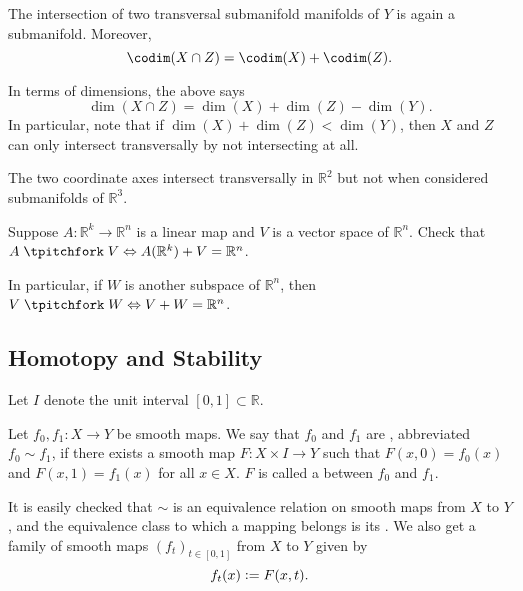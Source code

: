 \begin{thm}
	The intersection of two transversal submanifold manifolds of $Y$ is again a submanifold. Moreover,
	\begin{equation*} 
		\codim(X \cap Z) = \codim(X) + \codim(Z).
	\end{equation*}
\end{thm}
In terms of dimensions, the above says
\begin{equation*} 
	\dim(X \cap Z) = \dim(X) + \dim(Z) - \dim(Y).
\end{equation*}
In particular, note that if $\dim(X) + \dim(Z) < \dim(Y)$, then $X$ and $Z$ can only intersect transversally by not intersecting at all. 

\begin{ex}
	The two coordinate axes intersect transversally in $\mathbb{R}^{2}$ but not when considered submanifolds of $\mathbb{R}^{3}$.
\end{ex}

\begin{exe}
	Suppose $A : \mathbb{R}^{k} \to \mathbb{R}^{n}$ is a linear map and $V$ is a vector space of $\mathbb{R}^{n}$. Check that $A \trans V \Leftrightarrow A(\mathbb{R}^{k}) + V = \mathbb{R}^{n}$. 

	In particular, if $W$ is another subspace of $\mathbb{R}^{n}$, then $V \trans W \Leftrightarrow V + W = \mathbb{R}^{n}$.
\end{exe}

\subsection{Homotopy and Stability}

Let $I$ denote the unit interval $[0, 1] \subset \mathbb{R}$.

\begin{defn}
	Let $f_{0}, f_{1} : X \to Y$ be smooth maps. We say that $f_{0}$ and $f_{1}$ are , abbreviated $f_{0} \sim f_{1}$, if there exists a smooth map $F : X \times I \to Y$ such that $F(x, 0) = f_{0}(x)$ and $F(x, 1) = f_{1}(x)$ for all $x \in X$. \newline
	$F$ is called a  between $f_{0}$ and $f_{1}$.
\end{defn}

It is easily checked that $\sim$ is an equivalence relation on smooth maps from $X$ to $Y$, and the equivalence class to which a mapping belongs is its . We also get a family of smooth maps $(f_{t})_{t \in [0, 1]}$ from $X$ to $Y$ given by
\begin{equation*} 
	f_{t}(x) \vcentcolon= F(x, t).
\end{equation*}

